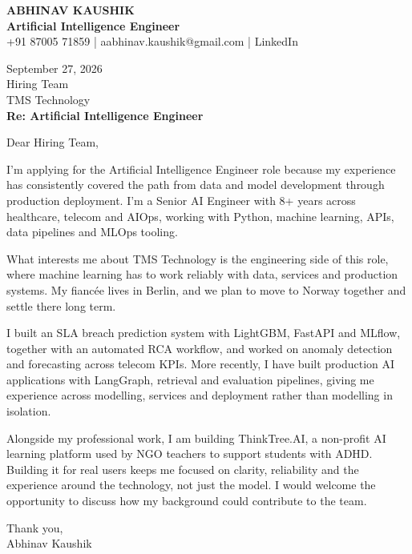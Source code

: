 \documentclass[10pt,a4paper]{article}
\begin{document}
\begin{center}
{\Large\bfseries ABHINAV KAUSHIK}\\[2pt]
{\bfseries Artificial Intelligence Engineer}\\[2pt]
+91 87005 71859 \quad | \quad aabhinav.kaushik@gmail.com \quad | \quad LinkedIn
\end{center}
\vspace{8pt}
September 27, 2026\\[6pt]
Hiring Team\\
TMS Technology\\[4pt]
\textbf{Re: Artificial Intelligence Engineer}

Dear Hiring Team,

I’m applying for the Artificial Intelligence Engineer role because my experience has consistently covered the path from data and model development through production deployment. I’m a Senior AI Engineer with 8+ years across healthcare, telecom and AIOps, working with Python, machine learning, APIs, data pipelines and MLOps tooling.

What interests me about TMS Technology is the engineering side of this role, where machine learning has to work reliably with data, services and production systems. My fiancée lives in Berlin, and we plan to move to Norway together and settle there long term.

I built an SLA breach prediction system with LightGBM, FastAPI and MLflow, together with an automated RCA workflow, and worked on anomaly detection and forecasting across telecom KPIs. More recently, I have built production AI applications with LangGraph, retrieval and evaluation pipelines, giving me experience across modelling, services and deployment rather than modelling in isolation.

Alongside my professional work, I am building ThinkTree.AI, a non-profit AI learning platform used by NGO teachers to support students with ADHD. Building it for real users keeps me focused on clarity, reliability and the experience around the technology, not just the model. I would welcome the opportunity to discuss how my background could contribute to the team.

Thank you,\\
Abhinav Kaushik
\end{document}
